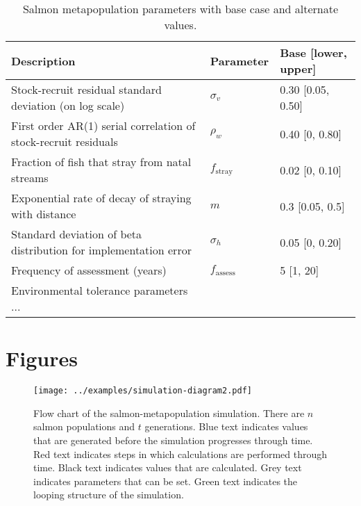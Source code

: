 \clearpage

\begin{table}[h!]
\centering
\small
\caption{Salmon metapopulation parameters with base case and alternate values.}
\begin{tabular}{p{7.0cm}p{1.6cm}p{3.2cm}}
\toprule
Description                                                      & Parameter             & Base [lower, upper] \\
\midrule
Stock-recruit residual standard deviation (on log scale)         & $\sigma_v$            & 0.30 [0.05, 0.50] \\
First order AR(1) serial correlation of stock-recruit residuals  & $\rho_w$              & 0.40 [0, 0.80] \\
Fraction of fish that stray from natal streams                   & $f_{\mathrm{stray}}$  & 0.02 [0, 0.10] \\
Exponential rate of decay of straying with distance              & $m$                   & 0.3 [0.05, 0.5] \\
Standard deviation of beta distribution for implementation error & $\sigma_{h}$          & 0.05 [0, 0.20] \\
Frequency of assessment (years)                                  & $f_{\mathrm{assess}}$ & 5 [1, 20] \\
Environmental tolerance parameters ... & & \\
\bottomrule
\end{tabular}
\label{t:pars}
\end{table}

\clearpage

\section{Figures}

\clearpage

\begin{figure}[htbp]
\centering
\texttt{[image: ../examples/simulation-diagram2.pdf]}
\caption{Flow chart of the salmon-metapopulation simulation. There are $n$ salmon populations and $t$ generations. Blue text indicates values that are generated before the simulation progresses through time. Red text indicates steps in which calculations are performed through time. Black text indicates values that are calculated. Grey text indicates parameters that can be set. Green text indicates the looping structure of the simulation.}
\label{f:sim-flow}
\end{figure}

